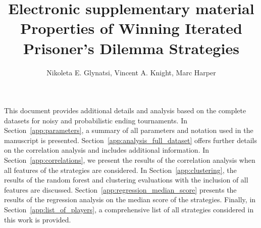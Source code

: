\documentclass{article}
\title{{\LARGE Electronic supplementary material}\\{\bf \LARGE Properties of Winning Iterated Prisoner's Dilemma Strategies}}
\author{Nikoleta E. Glynatsi, Vincent A. Knight, Marc Harper}
\date{}
\begin{document}
\maketitle



\noindent
This document provides additional details and analysis based on the complete
datasets for noisy and probabilistic ending tournaments. In
Section~\ref{app:parameters}, a summary of all parameters and notation used in
the manuscript is presented. Section~\ref{app:analysis_full_dataset} offers
further details on the correlation analysis and includes additional information.
In Section~\ref{app:correlations}, we present the results of the correlation
analysis when all features of the strategies are considered. In
Section~\ref{app:clustering}, the results of the random forest and clustering
evaluations with the inclusion of all features are discussed.
Section~\ref{app:regression_median_score} presents the results of the regression
analysis on the median score of the strategies. Finally, in
Section~\ref{app:list_of_players}, a comprehensive list of all strategies
considered in this work is provided.










\end{document}
